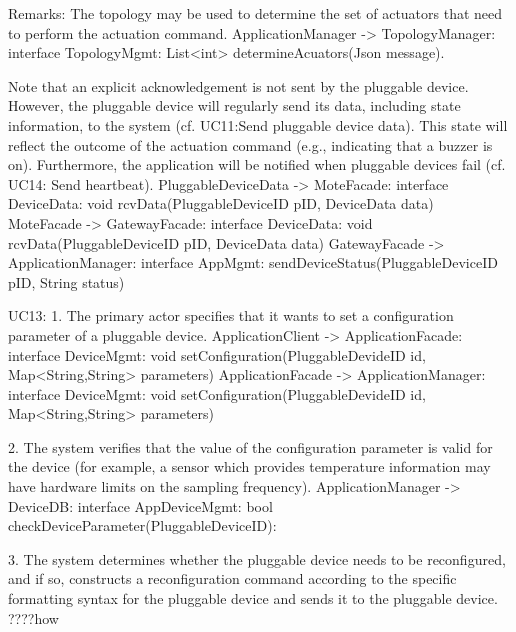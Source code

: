             Remarks:
            The topology may be used to determine the set of actuators that need 
            to perform the actuation command.
                ApplicationManager -> TopologyManager: interface TopologyMgmt:
                                                             List<int> determineAcuators(Json message).
            
            Note that an explicit acknowledgement is not sent by the pluggable device. However, 
            the pluggable device will regularly send its data, including state information, to the system 
            (cf. UC11:Send pluggable device data). This state will reflect the outcome of the actuation command
            (e.g., indicating that a buzzer is on). Furthermore, the application will be notified when
            pluggable devices fail (cf. UC14: Send heartbeat).
                PluggableDeviceData -> MoteFacade: interface DeviceData: void rcvData(PluggableDeviceID pID, DeviceData data)
                MoteFacade -> GatewayFacade: interface DeviceData: void rcvData(PluggableDeviceID pID, DeviceData data)
                GatewayFacade -> ApplicationManager: interface AppMgmt: sendDeviceStatus(PluggableDeviceID pID, String status)

                
                
        UC13: 
        1. The primary actor specifies that it wants to set a configuration parameter of a pluggable
            device.
                ApplicationClient -> ApplicationFacade: interface DeviceMgmt:
                                                        void setConfiguration(PluggableDevideID id, Map<String,String> parameters)
                ApplicationFacade -> ApplicationManager: interface DeviceMgmt:
                                                        void setConfiguration(PluggableDevideID id, Map<String,String> parameters)
            
                
        2. The system verifies that the value of the configuration parameter is valid for the device (for
            example, a sensor which provides temperature information may have hardware limits on the
            sampling frequency).
                ApplicationManager -> DeviceDB: interface AppDeviceMgmt: bool checkDeviceParameter(PluggableDeviceID):
                                                      
            
        3. The system determines whether the pluggable device needs to be reconfigured, and if so,
           constructs a reconfiguration command according to the specific formatting syntax for the
           pluggable device and sends it to the pluggable device. ????how
            
